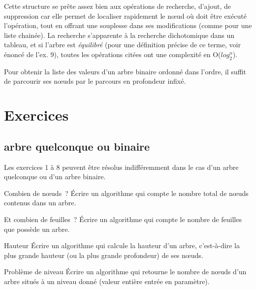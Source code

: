 	Cette structure se prête assez bien aux opérations de recherche, 
	d'ajout, de suppression car elle permet de localiser
	rapidement le n{\oe}ud où doit être exécuté l'opération, 
	tout en offrant une souplesse dans ses modifications (comme
	pour une liste chainée). La recherche s'apparente à la 
	recherche dichotomique dans un tableau, et si l'arbre est
	\textit{équilibré} (pour une définition précise de ce terme, 
	voir énoncé de l'ex. 9), toutes les opérations citées ont
	une complexité en O($log_2^n$).

	Pour obtenir la liste des valeurs d'un arbre binaire ordonné 
	dans l'ordre, il suffit de parcourir ses n{\oe}uds par le
	parcours en profondeur infixé.



\section{Exercices}

	\subsection{arbre quelconque ou binaire}
		Les exercices 1 à 8 peuvent être résolus indifféremment 
		dans le cas d{}'un arbre quelconque ou d'un arbre binaire.

		\begin{Exercice}{Combien de n{\oe}uds~?}
			Écrire un algorithme qui compte le nombre total de 
			n{\oe}uds contenus dans un arbre.
		\end{Exercice}
		
		\begin{Exercice}{Et combien de feuilles~?}
			Écrire un algorithme qui compte le nombre de feuilles que possède un arbre.
		\end{Exercice}
		
		\begin{Exercice}{Hauteur}
			Écrire un algorithme qui calcule la hauteur d'un arbre, 
			c'est-à-dire la plus grande hauteur (ou la plus grande
			profondeur) de ses n{\oe}uds.
		\end{Exercice}
		
		\begin{Exercice}{Problème de niveau}
			Écrire un algorithme qui retourne le nombre de n{\oe}uds 
			d'un arbre situés à un niveau donné (valeur entière entrée en
			paramètre).
		\end{Exercice}

